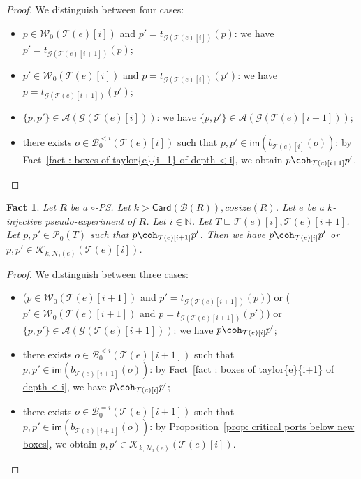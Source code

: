 \documentclass{article}
\newcommand{\target}[1]{t_{#1}}
\theoremstyle{plain}
\newtheorem{fact}[theorem]{Fact}
\newcommand{\Nat}{\ensuremath{\mathbb{N}}}
\newcommand{\taylor}[2]{\mathcal{T}(#1)[#2]}
\newcommand{\criticalports}[3]{\mathcal{K}_{#2, #3}(#1)}
\newcommand{\groundof}[1]{\mathcal{G}(#1)}
\newcommand{\cosize}[1]{\textit{cosize}(#1)}
\newcommand{\im}[1]{\textsf{im}(#1)}
\newcommand{\portsatzero}[1]{\mathcal{P}_0(#1)}
\newcommand{\wiresatzero}[1]{\mathcal{W}_0(#1)}
\newcommand{\axioms}[1]{\mathcal{A}(#1)}
\newcommand{\Card}[1]{\textsf{Card}\left( #1 \right)}
\newcommand{\boxes}[1]{\mathcal{B}(#1)}
\newcommand{\exactboxesatzero}[2]{\mathcal{B}_{0}^{=#2}(#1)}
\newcommand{\boxesatzerosmaller}[2]{\mathcal{B}_0^{< #2}(#1)}
\begin{document}
\begin{proof}
We distinguish between four cases:
\begin{itemize}
\item $p \in \wiresatzero{\taylor{e}{i}}$ and $p' = \target{\groundof{\taylor{e}{i}}}(p)$: we have $p' = \target{\groundof{\taylor{e}{i+1}}}(p)$;
\item $p' \in \wiresatzero{\taylor{e}{i}}$ and $p = \target{\groundof{\taylor{e}{i}}}(p')$: we have $p = \target{\groundof{\taylor{e}{i+1}}}(p')$;
\item $\{ p, p' \} \in \axioms{\groundof{\taylor{e}{i}}}$: we have $\{ p, p' \} \in \axioms{\groundof{\taylor{e}{i+1}}}$;
\item there exists $o \in \boxesatzerosmaller{\taylor{e}{i}}{i}$ such that $p, p' \in \im{b_{\taylor{e}{i}}(o)}$: by Fact~\ref{fact : boxes of taylor{e}{i+1} of depth < i}, we obtain $p \coh_{\taylor{e}{i+1}} p'$.
\end{itemize}
\end{proof}

\begin{fact}\label{fact: coh[i+1]}
Let $R$ be a $\circ$-PS. Let $k > \Card{\boxes{R}{}}, \cosize{R}$. 
Let $e$ be a $k$-injective pseudo-experiment of $R$. Let $i \in \Nat$. 
Let $T \sqsubseteq \taylor{e}{i}, \taylor{e}{i+1}$. 
Let $p, p' \in \portsatzero{T}$ such that $p \coh_{\taylor{e}{i+1}} p'$.
 Then we have $p \coh_{\taylor{e}{i}} p'$ or $p, p' \in \criticalports{\taylor{e}{i}}{k}{\mathcal{N}_i(e)}$.
\end{fact}

\begin{proof}
We distinguish between three cases:
\begin{itemize}
\item ($p \in \wiresatzero{\taylor{e}{i+1}}$ and $p' = \target{\groundof{\taylor{e}{i+1}}}(p)$) or ($p' \in \wiresatzero{\taylor{e}{i+1}}$ and $p = \target{\groundof{\taylor{e}{i+1}}}(p')$) or $\{ p, p' \} \in \axioms{\groundof{\taylor{e}{i+1}}}$: we have $p \coh_{\taylor{e}{i}} p'$;
\item there exists $o \in \boxesatzerosmaller{\taylor{e}{i+1}}{i}$ such that $p, p' \in \im{b_{\taylor{e}{i+1}}(o)}$: by  Fact~\ref{fact : boxes of taylor{e}{i+1} of depth < i}, we have $p \coh_{\taylor{e}{i}} p'$;
\item there exists $o \in \exactboxesatzero{\taylor{e}{i+1}}{i}$ such that $p, p' \in \im{b_{\taylor{e}{i+1}}(o)}$: by  Proposition~\ref{prop: critical ports below new boxes}, we obtain $p, p' \in \criticalports{\taylor{e}{i}}{k}{\mathcal{N}_i(e)}$.
\end{itemize}
\end{proof}
\end{document}

